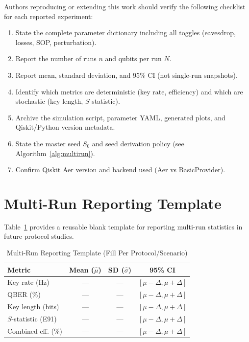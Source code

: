 \documentclass[journal]{IEEEtran}
\begin{document}
Authors reproducing or extending this work should verify the
following checklist for each reported experiment:

\begin{enumerate}
  \item State the complete parameter dictionary including all toggles
        (eavesdrop, losses, SOP, perturbation).
  \item Report the number of runs $n$ and qubits per run $N$.
  \item Report mean, standard deviation, and 95\% CI (not single-run
        snapshots).
  \item Identify which metrics are deterministic (key rate, efficiency)
        and which are stochastic (key length, $S$-statistic).
  \item Archive the simulation script, parameter YAML, generated
        plots, and Qiskit/Python version metadata.
  \item State the master seed $S_0$ and seed derivation policy
        (see Algorithm~\ref{alg:multirun}).
  \item Confirm Qiskit Aer version and backend used (Aer vs BasicProvider).
\end{enumerate}

\section{Multi-Run Reporting Template}
\label{app:template}

Table~\ref{tab:template} provides a reusable blank template for
reporting multi-run statistics in future protocol studies.

\begin{table}[!h]
  \caption{Multi-Run Reporting Template (Fill Per Protocol/Scenario)}
  \label{tab:template}
  \centering
  \footnotesize
  \begin{tabular}{lccc}
    \toprule
    Metric & Mean ($\hat{\mu}$) & SD ($\hat{\sigma}$) & 95\% CI \\
    \midrule
    Key rate (Hz)         & --- & --- & $[\mu-\Delta, \mu+\Delta]$ \\
    QBER (\%)             & --- & --- & $[\mu-\Delta, \mu+\Delta]$ \\
    Key length (bits)     & --- & --- & $[\mu-\Delta, \mu+\Delta]$ \\
    $S$-statistic (E91)   & --- & --- & $[\mu-\Delta, \mu+\Delta]$ \\
    Combined eff. (\%)    & --- & --- & $[\mu-\Delta, \mu+\Delta]$ \\
    \bottomrule
  \end{tabular}
\end{table}
\end{document}
